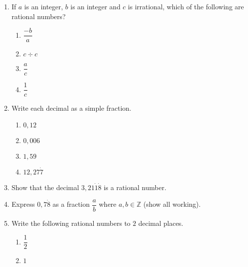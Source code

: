 \begin{solutions}{}
{
}
\end{solutions}

\begin{eocexercises}{}
\begin{enumerate}[itemsep=5pt, label=\textbf{\arabic*}. ] 
\item If $a$ is an integer, $b$ is an integer and $c$ is irrational, which of the following are rational numbers?
    \begin{enumerate}[itemsep=5pt, label=\textbf{(\alph*)} ] 
    \item $\dfrac{-b}{a}$
    \item $c \div c$
    \item $\dfrac{a}{c}$
    \item $\dfrac{1}{c}$
    \end{enumerate}
\item Write each decimal as a simple fraction.
    \begin{enumerate}[itemsep=5pt, label=\textbf{(\alph*)} ] 
    \item $0,12$
    \item $0,006$
    \item $1,59$
    \item $12,27\dot{7}$
    \end{enumerate}
\item Show that the decimal $3,21\dot{1}\dot{8}$ is a rational number.
\item Express $0,7\dot{8}$ as a fraction $\dfrac{a}{b}$ where $a,b\in \mathbb{Z}$ (show all working).
\item Write the following rational numbers to $2$ decimal places.
    \begin{enumerate}[itemsep=5pt, label=\textbf{(\alph*)} ]  
    \item $\dfrac{1}{2}$
    \item $1$

\end{enumerate}
\end{enumerate}
\end{eocexercises}
